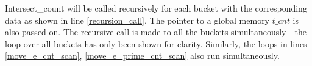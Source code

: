 \documentclass[conference]{IEEEtran}
\begin{document}
Intersect\_count will be called recursively for each bucket with the corresponding data as shown in line \ref{recursion_call}. The pointer to a global memory $t\_cnt$ is also passed on. The recursive call is made to all the buckets simultaneously - the loop over all buckets has only been shown for clarity. Similarly, the loops in lines \ref{move_e_cnt_scan}, \ref{move_e_prime_cnt_scan} also run simultaneously.


\end{document}

